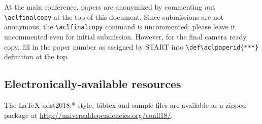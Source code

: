 \documentclass[11pt,a4paper]{article}
\def\aclpaperid{***} %
\begin{document}
At the main conference, papers are anonymized by commenting out
{\small\verb|\aclfinalcopy|} at the top of this 
 document. Since \udst{} submissions are not anonymous, the {\small\verb|\aclfinalcopy|} command is uncommented; please leave it uncommented even for initial submission. However, for the final camera ready copy, fill in the paper number as assigned by START into {\small\verb|\def\aclpaperid{***}|} definition at the top.




\subsection{Electronically-available resources}

The LaTeX udst2018.* style, bibtex and sample files are available 
as a zipped package at \url{http://universaldependencies.org/conll18/}.
%
\end{document}
